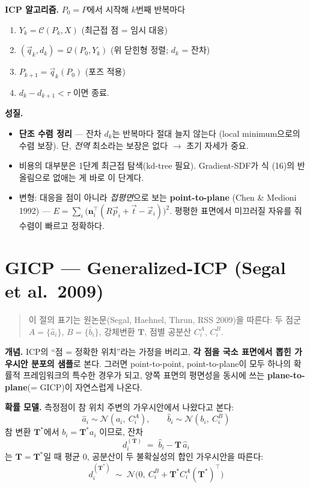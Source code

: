 \textbf{ICP 알고리즘.} $P_0=P$에서 시작해 $k$번째 반복마다
\begin{enumerate}
  \item $Y_k = \mathcal{C}(P_k, X)$ \quad (최근접 점 = 임시 대응)
  \item $(\vec{q}_k, d_k) = \mathcal{Q}(P_0, Y_k)$ \quad (위 닫힌형 정렬;
  $d_k$ = 잔차)
  \item $P_{k+1} = \vec{q}_k(P_0)$ \quad (포즈 적용)
  \item $d_k - d_{k+1} < \tau$ 이면 종료.
\end{enumerate}

\textbf{성질.}
\begin{itemize}
  \item \textbf{단조 수렴 정리} --- 잔차 $d_k$는 반복마다 절대 늘지 않는다
  (local minimum으로의 수렴 보장). 단, \emph{전역} 최소라는 보장은 없다 $\to$
  초기 자세가 중요.
  \item 비용의 대부분은 1단계 최근접 탐색(kd-tree 필요). Gradient-SDF가 식
  (16)의 반올림으로 없애는 게 바로 이 단계다.
  \item 변형: 대응을 점이 아니라 \emph{접평면}으로 보는
  \textbf{point-to-plane} (Chen \& Medioni 1992) ---
  $E=\sum_i \big(\mathbf{n}_i^{\top}(R\vec{p}_i+\vec{t}-\vec{x}_i)\big)^2$.
  평평한 표면에서 미끄러질 자유를 줘 수렴이 빠르고 정확하다.
\end{itemize}

\section{GICP --- Generalized-ICP (Segal et al.\ 2009)}
\label{sec:gicp}

\begin{quote}
  \small 이 절의 표기는 원논문(Segal, Haehnel, Thrun, RSS 2009)을 따른다:
  두 점군 $A=\{\hat{a}_i\}$, $B=\{\hat{b}_i\}$, 강체변환 $\mathbf{T}$,
  점별 공분산 $C_i^A$, $C_i^B$.
\end{quote}

\textbf{개념.} ICP의 ``점 = 정확한 위치''라는 가정을 버리고, \textbf{각 점을
국소 표면에서 뽑힌 가우시안 분포의 샘플}로 본다. 그러면 point-to-point,
point-to-plane이 모두 하나의 확률적 프레임워크의 특수한 경우가 되고, 양쪽
표면의 평면성을 동시에 쓰는 \textbf{plane-to-plane}(= GICP)이 자연스럽게
나온다.

\textbf{확률 모델.} 측정점이 참 위치 주변의 가우시안에서 나왔다고 본다:
\begin{equation*}
  \hat{a}_i \sim \mathcal{N}(a_i,\ C_i^A), \qquad
  \hat{b}_i \sim \mathcal{N}(b_i,\ C_i^B)
\end{equation*}
참 변환 $\mathbf{T}^*$에서 $b_i = \mathbf{T}^* a_i$ 이므로, 잔차
\begin{equation*}
  d_i^{(\mathbf{T})} \;=\; \hat{b}_i - \mathbf{T}\,\hat{a}_i
\end{equation*}
는 $\mathbf{T}=\mathbf{T}^*$일 때 평균 0, 공분산이 두 불확실성의 합인
가우시안을 따른다:
\begin{equation*}
  d_i^{(\mathbf{T}^*)} \;\sim\;
  \mathcal{N}\!\big(0,\ C_i^B + \mathbf{T}^* C_i^A (\mathbf{T}^*)^{\top}\big)
\end{equation*}

